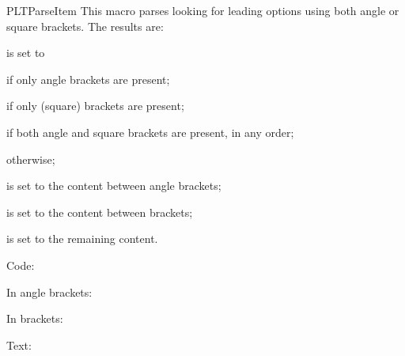 \documentclass[a4paper, 11pt]{article}
\begin{document}
\begin{macrodef}{PLTParseItem}{}
    This macro parses  looking for leading options using both angle or square brackets. The results are:
    \begin{itemizeitemize}
        \item {} is set to
        \begin{itemizeitemize}
            \item {} if only angle brackets are present;
            \item {} if only (square) brackets are present;
            \item {} if both angle and square brackets are present, in any order;
            \item {} otherwise;
        \end{itemizeitemize}
        \item {} is set to the content between angle brackets;
        \item {} is set to the content between brackets;
        \item {} is set to the remaining content.
    \end{itemizeitemize}
\end{macrodef}

\begin{example}{}
    \noindent Code: \texttt{\opttype}\par
    In angle brackets: \texttt{\angleopts}\par
    In brackets: \texttt{\bracketopts}\par
    Text: \texttt{\body}\par
\end{example}
\end{document}
